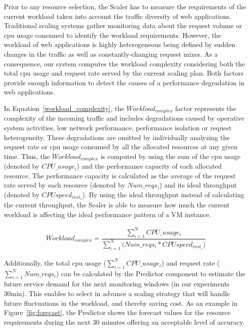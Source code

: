 Prior to any resource selection, the Scaler has to measure the requirements of the current workload taken into account the traffic diversity of web applications. Traditional scaling systems gather monitoring data about the request volume or cpu usage consumed to identify the workload requirements. However, the workload of web applications is highly heterogeneous being defined by sudden changes in the traffic as well as constantly-changing request mixes. As a consequence, our system computes the workload complexity considering both the total cpu usage and request rate served by the current scaling plan. Both factors provide enough information to detect the causes of a performance degradation in web applications. 

In Equation~\ref{workload_complexity}, the \emph{$Workload_{complex}$} factor represents the complexity of the incoming traffic and includes degradations caused by operative system activities, low network performance, performance isolation or request heterogeneity. These degradations are omitted by individually analyzing the request rate or cpu usage consumed by all the allocated resources at any given time. Thus, the \emph{$Workload_{complex}$} is computed by using the sum of the cpu usage (denoted by \emph{$CPU\_usage_{i}$}) and the performance capacity of each allocated resource. The performance capacity is calculated as the average of the request rate served by each resource (denoted by $Num\_reqs_{i}$) and its ideal throughput (denoted by $CPU speed_{inst_{i}}$). By using the ideal throughput instead of calculating the current throughput, the Scaler is able to measure how much the current workload is affecting the ideal performance pattern of a VM instance.

{\scriptsize
\begin{equation}\label{workload_complexity}
\begin{split}
Workload_{complex}  = \dfrac{ \sum_{i=1}^N CPU\_usage_{i}  }  {  \sum_{i=1}^N \bigg(  Num\_reqs_{i}  * CPU speed_{inst_{i}}   \bigg)   }
\end{split}
\end{equation}
}

Additionally, the total cpu usage ($\sum_{i=1}^N CPU\_usage_{i} $) and request rate ($\sum_{i=1}^N  Num\_reqs_{i}$) can be calculated by the Predictor component to estimate the future service demand for the next monitoring windows (in our experiments 30min). This enables to select in advance a scaling strategy that will handle future fluctuations in the workload, and thereby saving cost. As an example in Figure~\ref{fig:forecast}, the Predictor shows the forecast values for the resource requirements during the next 30 minutes offering an acceptable level of accuracy. 

